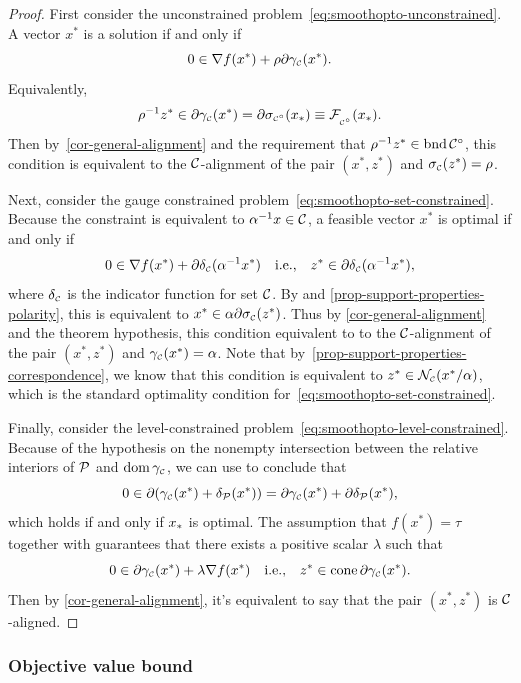 \begin{proof}
  First consider the unconstrained
  problem~\eqref{eq:smoothopto-unconstrained}. A vector $x^*$ is a
  solution if and only if
  \[0\in\nabla f(x^*) + \rho\partial\gamma_{\scriptscriptstyle\mathcal{C}}(x^*).\] Equivalently,
  \[
    \rho^{-1}z^* \in \partial\gamma_{\scriptscriptstyle\mathcal{C}}(x^*)=\partial\sigma_{\scriptscriptstyle\mathcal{C}^\circ}(x_*)
    \equiv\mathcal{F}_{\scriptscriptstyle _{\scriptscriptstyle\mathcal{C}^\circ}}(x_*).
  \]
  Then by~\autoref{cor-general-alignment} and the requirement that $\rho^{-1}z^*
  \in \operatorname{bnd}\mathcal{C}^\circ$, this condition is equivalent to the $\mathcal{C}$-alignment of
  the pair $(x^*,z^*)$ and $\sigma_{\scriptscriptstyle\mathcal{C}}(z^*) = \rho$.

  Next, consider the gauge constrained
  problem~\eqref{eq:smoothopto-set-constrained}. Because
  the constraint is equivalent to $\alpha^{-1}x\in\mathcal{C}$,
  a feasible vector $x^*$ is optimal if and only if
  \[
    0\in\nabla f(x^*) + \partial\delta_{\scriptscriptstyle\mathcal{C}}(\alpha^{-1}x^*) \hbox{\quad i.e.,\quad}
    z^* \in \partial\delta_{\scriptscriptstyle\mathcal{C}}(\alpha^{-1}x^*),
  \]
  where $\delta_{\scriptscriptstyle\mathcal{C}}$ is the indicator function for set $\mathcal{C}$. By
  \citet[Theorem~23.5]{rockafellar1970convex} and
  \autoref{prop-support-properties-polarity}, this is equivalent to $x^* \in
  \alpha\partial\sigma_{\scriptscriptstyle\mathcal{C}}(z^*)$. Thus by \autoref{cor-general-alignment} and the
  theorem hypothesis, this condition equivalent to to the $\mathcal{C}$-alignment of
  the pair $(x^*,z^*)$ and $\gamma_{\scriptscriptstyle\mathcal{C}}(x^*) = \alpha$. Note that
  by~\autoref{prop-support-properties-correspondence}, we know that this condition
  is equivalent to $z^* \in \mathcal{N}_{\scriptscriptstyle\mathcal{C}}(x^*/\alpha)$, which is the standard
  optimality condition for~\eqref{eq:smoothopto-set-constrained}.
    
  Finally, consider the level-constrained
  problem~\eqref{eq:smoothopto-level-constrained}. Because of the hypothesis on
  the nonempty intersection between the relative interiors of $\mathcal{P}$ and
  $\operatorname{dom}\gamma_{\scriptscriptstyle\mathcal{C}}$, we can use \citet[Theorem~23.8]{rockafellar1970convex} to
  conclude that
  \[
    0 \in \partial(\gamma_{\scriptscriptstyle\mathcal{C}}(x^*) + \delta_{\mathcal{P}}(x^*))
    = \partial\gamma_{\scriptscriptstyle\mathcal{C}}(x^*) + \partial\delta_{\mathcal{P}}(x^*),
  \]
  which holds if and only if $x_*$ is optimal. The assumption that $f(x^*) =
  \tau$ together with \citet[Theorem~D.1.3.5]{hiriart-urruty01} guarantees that
  there exists a positive scalar $\lambda$ such that
  \[0 \in \partial\gamma_{\scriptscriptstyle\mathcal{C}}(x^*) + \lambda\nabla f(x^*) \hbox{\quad i.e.,\quad} z^* \in
    \operatorname{cone} \partial\gamma_{\scriptscriptstyle\mathcal{C}}(x^*).\] Then by \autoref{cor-general-alignment}, it's
    equivalent to say that the pair $(x^*,z^*)$ is $\mathcal{C}$-aligned.
\end{proof}

\subsubsection{Objective value bound}

